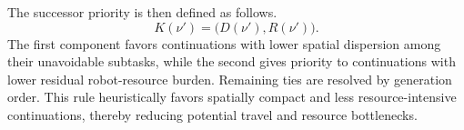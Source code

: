 \documentclass[lettersize,journal]{IEEEtran}
\theoremstyle{italiclemma}
\theoremstyle{italiclemma}
\theoremstyle{definition}
\begin{document}
The successor priority is then defined  as follows.
\begin{equation}
K(\nu')
=
\bigl(D(\nu'),R(\nu')\bigr).
\label{eq:rollout_priority}
\end{equation}
The first component favors continuations with lower spatial dispersion among their unavoidable subtasks, while the second gives priority to
continuations with lower residual robot-resource burden. Remaining ties are resolved by generation order. This rule heuristically favors spatially compact and less resource-intensive continuations, thereby reducing potential travel and resource bottlenecks.







\end{document}

